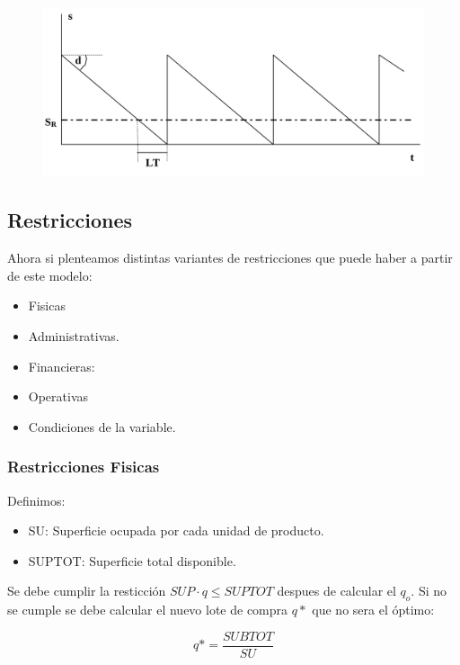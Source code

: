 \documentclass{article}
\begin{document}
\begin{figure}[h!]
    \includegraphics[width=\linewidth]{imagenes/stock-reorden.png}
\end{figure}


\newpage
\subsection{Restricciones}

Ahora si plenteamos distintas variantes de restricciones que puede haber a partir de este modelo:

\begin{itemize}
    \item Fisicas
    \item Administrativas.
    \item Financieras:
    \item Operativas
    \item Condiciones de la variable.
\end{itemize}

\subsubsection{Restricciones Fisicas}

Definimos:
\begin{itemize}
    \item SU: Superficie ocupada por cada unidad de producto.
    \item SUPTOT: Superficie total disponible.
\end{itemize}
Se debe cumplir la resticción \(SUP \cdot q \leq SUPTOT\) despues de calcular el \(q_o\). 
Si no se cumple se debe calcular el nuevo lote de compra \(q*\) que no sera el óptimo:

\begin{equation}
    q* = \frac{SUBTOT}{SU}
\end{equation}
\end{document}
